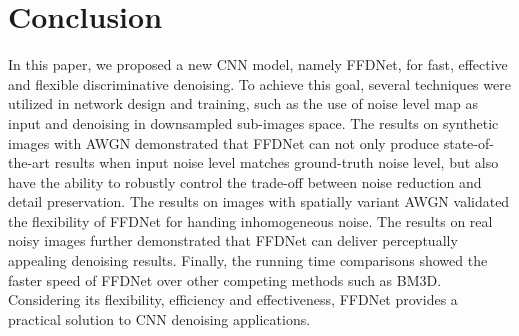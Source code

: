 \documentclass[journal]{IEEEtran}
\begin{document}
\section{Conclusion}
\label{sec:conclusion}
In this paper, we proposed a new CNN model, namely FFDNet, for fast, effective and flexible discriminative denoising. To achieve this goal, several techniques were utilized in network design and training, such as the use of noise level map as input and denoising in downsampled sub-images space. The results on synthetic images with AWGN demonstrated that FFDNet can not only produce state-of-the-art results when input noise level matches ground-truth noise level, {but also have the ability to robustly control
the trade-off between noise reduction and detail preservation}. The results on images with spatially variant AWGN validated the flexibility of FFDNet for handing inhomogeneous noise. The results on real noisy images further demonstrated that FFDNet can deliver perceptually appealing denoising results. Finally, the running time comparisons showed the faster speed of FFDNet over other competing methods such as BM3D. Considering its flexibility, efficiency and effectiveness, FFDNet provides a practical solution to CNN denoising applications.










\end{document}
